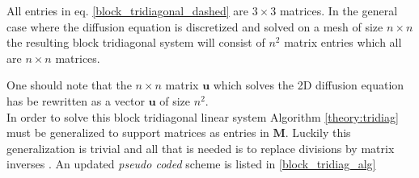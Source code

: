 \noindent All entries in eq. \eqref{block_tridiagonal_dashed} are $3\times3$ matrices. 
In the general case where the diffusion equation is discretized and solved on a mesh of size $n\times n$ the resulting block tridiagonal system will consist of $n^2$ matrix entries which all are $n\times n$ matrices.
% 
% 

One should note that the $n\times n$ matrix $\mathbf u$ which solves the 2D diffusion equation has be rewritten as a vector $\mathbf{u}$ of size $n^2$. \\ 

In order to solve this block tridiagonal linear system Algorithm \ref{theory:tridiag} must be generalized to support matrices as entries in $\mathbf M$. 
Luckily this generalization is trivial and all that is needed is to replace divisions by matrix inverses \cite{varah1972solution}. 
An updated \emph{pseudo coded} scheme is listed in \eqref{block_tridiag_alg}

